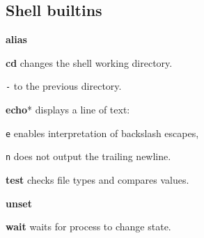 \subsection{Shell builtins}
\textbf{alias} \dotfill

\textbf{cd} changes the shell working directory.
\begin{enumx}
	\item [\texttt{-}] to the previous directory.
\end{enumx}

\textbf{echo}* displays a line of text:
\begin{enumx} 
	\item [\texttt{e}] enables interpretation of backslash escapes,
	\item [\texttt{n}] does not output the trailing newline.
\end{enumx}

\textbf{test} checks file types and compares values.

\textbf{unset} \dotfill

\textbf{wait} waits for process to change state.



